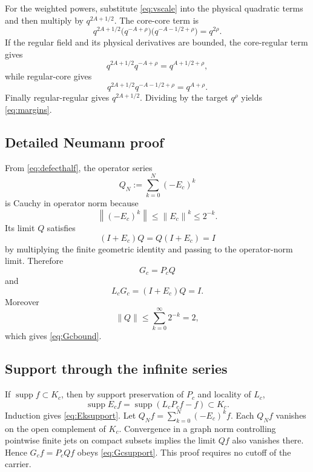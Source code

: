 \documentclass[11pt]{article}
\numberwithin{equation}{section}
\newcommand{\norm}[1]{\left\lVert #1\right\rVert}
\newcommand{\supp}{\operatorname{supp}}
\begin{document}
For the weighted powers, substitute \eqref{eq:vscale} into the physical quadratic terms and then multiply by \(q^{2A+1/2}\).  The core-core term is
\begin{equation}
q^{2A+1/2}\bigl(q^{-A+\rho}\bigr)
\bigl(q^{-A-1/2+\rho}\bigr)=q^{2\rho}.
\label{eq:ccderive}
\end{equation}
If the regular field and its physical derivatives are bounded, the core-regular term gives
\begin{equation}
q^{2A+1/2}q^{-A+\rho}=q^{A+1/2+\rho},
\label{eq:crderive}
\end{equation}
while regular-core gives
\begin{equation}
q^{2A+1/2}q^{-A-1/2+\rho}=q^{A+\rho}.
\label{eq:rcderive}
\end{equation}
Finally regular-regular gives \(q^{2A+1/2}\).  Dividing by the target \(q^\rho\) yields \eqref{eq:margins}.

\subsection{Detailed Neumann proof}
From \eqref{eq:defecthalf}, the operator series
\[
Q_N:=\sum_{k=0}^{N}(-E_c)^k
\]
is Cauchy in operator norm because
\begin{equation}
\norm{(-E_c)^k}\le\norm{E_c}^k\le2^{-k}.
\label{eq:geom}
\end{equation}
Its limit \(Q\) satisfies
\begin{equation}
(I+E_c)Q=Q(I+E_c)=I
\label{eq:twoinverse}
\end{equation}
by multiplying the finite geometric identity and passing to the operator-norm limit.  Therefore
\[
G_c=P_cQ
\]
and
\[
L_cG_c=(I+E_c)Q=I.
\]
Moreover
\begin{equation}
\norm Q\le\sum_{k=0}^\infty2^{-k}=2,
\label{eq:Q2}
\end{equation}
which gives \eqref{eq:Gcbound}.

\subsection{Support through the infinite series}
If \(\supp f\subset K_c\), then by support preservation of \(P_c\) and locality of \(L_c\),
\[
\supp E_cf=\supp(L_cP_cf-f)\subset K_c.
\]
Induction gives \eqref{eq:Eksupport}.  Let \(Q_Nf=\sum_{k=0}^N(-E_c)^kf\).  Each \(Q_Nf\) vanishes on the open complement of \(K_c\).  Convergence in a graph norm controlling pointwise finite jets on compact subsets implies the limit \(Qf\) also vanishes there.  Hence \(G_cf=P_cQf\) obeys \eqref{eq:Gcsupport}.  This proof requires no cutoff of the carrier.
\end{document}
